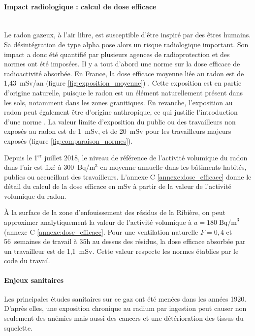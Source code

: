\documentclass{article}
\begin{document}
\paragraph{Impact radiologique : calcul de dose efficace \\ \\} Le radon gazeux, à l’air libre, est susceptible d’être inspiré par des êtres humains. Sa désintégration de type alpha pose alors un risque radiologique important. Son impact a donc été quantifié par plusieurs agences de radioprotection et des normes ont été imposées. Il y a tout d’abord une norme sur la dose efficace de radioactivité absorbée. En France, la dose efficace moyenne liée au radon est de 1,43~mSv/an (figure \ref{fig:exposition_moyenne}) \cite{irsn_quelle_nodate}. Cette exposition est en partie d’origine naturelle, puisque le radon est un élément naturellement présent dans les sols, notamment dans les zones granitiques. En revanche, l’exposition au radon peut également être d’origine anthropique, ce qui justifie l'introduction d'une norme \cite{inrs_rayonnements_nodate}. La valeur limite d’exposition du public ou des travailleurs non exposés au radon est de 1~mSv, et de 20~mSv pour les travailleurs majeurs exposés (figure \ref{fig:comparaison_normes}).

Depuis le 1$^{\text{er}}$ juillet 2018, le niveau de référence de l’activité volumique du radon dans l'air est fixé à 300~Bq/m$^3$ en moyenne annuelle \cite{autorite_de_surete_nucleaire_reglementation_nodate} dans les bâtiments habités, publics ou accueillant des travailleurs. L'annexe C \ref{annexe:dose_efficace} donne le détail du calcul de la dose efficace en mSv à partir de la valeur de l'activité volumique du radon.

À la surface de la zone d’enfouissement des résidus de la Ribière, on peut approximer analytiquement la valeur de l’activité volumique à $a=180 \; \text{Bq/m}^3$ (annexe C \ref{annexe:dose_efficace}. Pour une ventilation naturelle $F=0,4$ et 56~semaines de travail à 35h au dessus des résidus, la dose efficace absorbée par un travailleur est de 1,1~mSv. Cette valeur respecte les normes établies par le code du travail.

\paragraph{Enjeux sanitaires} Les principales études sanitaires sur ce gaz ont été menées dans les années 1920. D’après elles, une exposition chronique au radium par ingestion peut causer non seulement des anémies mais aussi des cancers et une détérioration des tissus du squelette.
\end{document}
